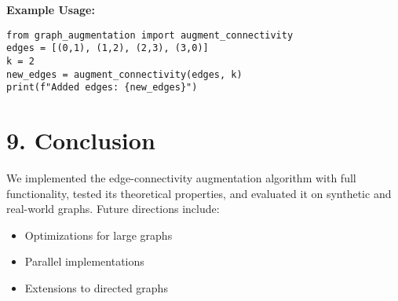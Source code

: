 \documentclass[11pt]{article}
\begin{document}
\noindent\textbf{Example Usage:}
\begin{verbatim}
from graph_augmentation import augment_connectivity
edges = [(0,1), (1,2), (2,3), (3,0)]
k = 2
new_edges = augment_connectivity(edges, k)
print(f"Added edges: {new_edges}")
\end{verbatim}

\section*{9. Conclusion}
We implemented the edge-connectivity augmentation algorithm with full functionality, tested its theoretical properties, and evaluated it on synthetic and real-world graphs. Future directions include:
\begin{itemize}
  \item Optimizations for large graphs
  \item Parallel implementations
  \item Extensions to directed graphs
\end{itemize}
\end{document}
